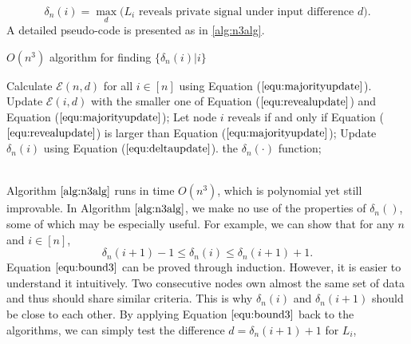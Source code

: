 \documentclass[a4paper,UKenglish]{lipics}
\theoremstyle{definition}
\newcommand{\hide}[1]{} %
\begin{document}
\begin{equation}
\label{equ:deltaupdate}
	\delta_n(i)
	 = 
	 \max_{d} \Big( \text{$L_i$ reveals private signal under input difference $d$} \Big).
\end{equation}
A detailed pseudo-code is presented as in \ref{alg:n3alg}.
\begin{algorithm}[htb]
\caption{$O(n^3)$ algorithm for finding $\{\delta_n(i)|i\}$} \label{alg:n3alg}
\begin{algorithmic}[1]
\hide{
\REQUIRE ~~\\
	The set of positive samples for current batch, $P_n$;\\
	The set of unlabeled samples for current batch, $U_n$;\\
	Ensemble of classifiers on former batches, $E_{n-1}$;\\
\ENSURE ~~\\              
	Ensemble of classifiers on the current batch, $E_n$;
	}
\STATE Calculate $\mathcal{E}(n,d)$ for all $i\in [n]$ using Equation ($\ref{equ:majorityupdate}$). 
	\STATE Update $\mathcal{E}(i,d)$ with the smaller one of Equation ($\ref{equ:revealupdate}$) and Equation ($\ref{equ:majorityupdate}$);
	\STATE Let node $i$ reveals if and only if Equation ($\ref{equ:revealupdate}$) is larger than Equation ($\ref{equ:majorityupdate}$);
\ENDFOR
{}
	\STATE Update $\delta_n(i)$ using Equation ($\ref{equ:deltaupdate}$).
\ENDFOR
\RETURN the $\delta_n(\cdot)$ function;

\end{algorithmic}
\end{algorithm}
\\
Algorithm $\ref{alg:n3alg}$ runs in time $O(n^3)$, which is polynomial yet still improvable. 
In Algorithm $\ref{alg:n3alg}$, we make no use of the properties of $\delta_n()$,
	some of which may be especially useful.
For example, we can show that for any $n$ and $i\in[n]$,
\begin{equation}
\label{equ:bound3}
\delta_n(i+1)-1\le \delta_n(i)\le \delta_n(i+1)+1.
\end{equation}
Equation $\ref{equ:bound3}$ can be proved through induction.
However, it is easier to understand it intuitively.
Two consecutive nodes own almost the same set of data and thus should share similar criteria.
This is why $\delta_n(i)$ and $\delta_n(i+1)$ should be close to each other.  
By applying Equation $\eqref{equ:bound3}$ back to the algorithms, 
	we can simply test the difference $d = \delta_n(i+1)+1$ for $L_i$,
\end{document}
